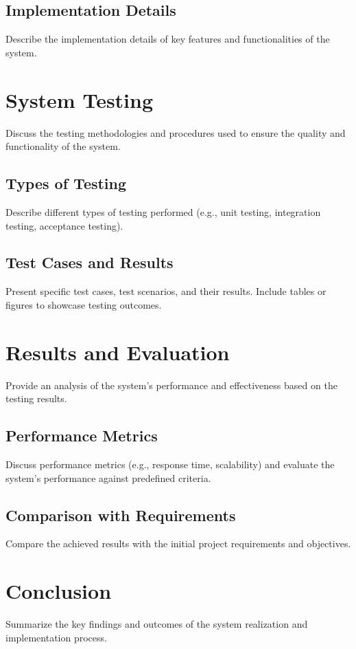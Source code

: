    	\subsection{Implementation Details}
   	
   	Describe the implementation details of key features and functionalities of the system.
   	
   	\section{System Testing}
   	
   	Discuss the testing methodologies and procedures used to ensure the quality and functionality of the system.
   	
   	\subsection{Types of Testing}
   	
   	Describe different types of testing performed (e.g., unit testing, integration testing, acceptance testing).
   	
   	\subsection{Test Cases and Results}
   	
   	Present specific test cases, test scenarios, and their results. Include tables or figures to showcase testing outcomes.
   	
   	\section{Results and Evaluation}
   	
   	Provide an analysis of the system's performance and effectiveness based on the testing results.
   	
   	\subsection{Performance Metrics}
   	
   	Discuss performance metrics (e.g., response time, scalability) and evaluate the system's performance against predefined criteria.
   	
   	\subsection{Comparison with Requirements}
   	
   	Compare the achieved results with the initial project requirements and objectives.
   	
   	\section{Conclusion}
   	
   	Summarize the key findings and outcomes of the system realization and implementation process.
   	
   
   